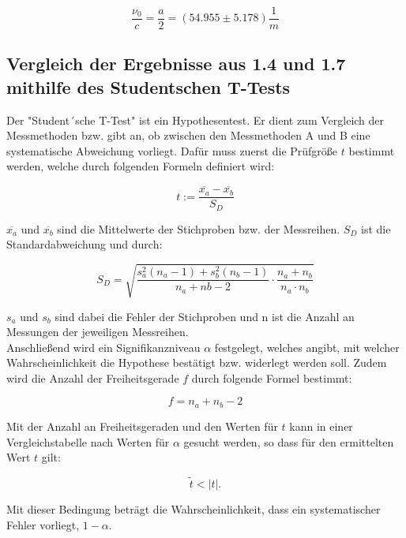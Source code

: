 \begin{equation}
  \frac{\nu_0}{c} = \frac{a}{2} = (54.955 \pm 5.178) \frac{1}{m}
\end{equation}


\subsection{Vergleich der Ergebnisse aus 1.4 und 1.7 mithilfe des Studentschen T-Tests}

Der "Student´sche T-Test" ist ein Hypothesentest. Er dient zum Vergleich der Messmethoden
bzw. gibt an, ob zwischen den Messmethoden A und B eine systematische Abweichung vorliegt.
Dafür muss zuerst die Prüfgröße $t$ bestimmt werden, welche durch folgenden Formeln definiert
wird:

\begin{equation}
  t := \frac{\overline{x_a} - \overline{x_b}}{S_D}
\end{equation}

$\overline{x_a}$ und $\overline{x_b}$ sind die Mittelwerte der Stichproben bzw. der Messreihen.
$S_D$ ist die Standardabweichung und durch:

\begin{equation}
  S_D = \sqrt{ \frac{s_a^2(n_a-1) + s_b^2(n_b-1)}{n_a + nb - 2} \cdot \frac{n_a + n_b}{n_a \cdot n_b}}
\end{equation}

$s_a$ und $s_b$ sind dabei die Fehler der Stichproben und n ist die Anzahl an Messungen der jeweiligen
Messreihen.\\
Anschließend wird ein Signifikanzniveau $\alpha$ festgelegt, welches angibt, mit welcher Wahrscheinlichkeit
die Hypothese bestätigt bzw. widerlegt werden soll. Zudem wird die Anzahl der Freiheitsgerade $f$ durch
folgende Formel bestimmt:

\begin{equation}
  f = n_a + n_b -2
\end{equation}

Mit der Anzahl an Freiheitsgeraden und den Werten für $t$ kann in einer Vergleichstabelle nach Werten für
 $\alpha$ gesucht werden, so dass für den ermittelten Wert $t$ gilt:

\begin{equation}
  \tilde{t} < \lvert t \rvert .
\end{equation}

Mit dieser Bedingung beträgt die Wahrscheinlichkeit, dass ein systematischer Fehler vorliegt, $1 - \alpha$.

